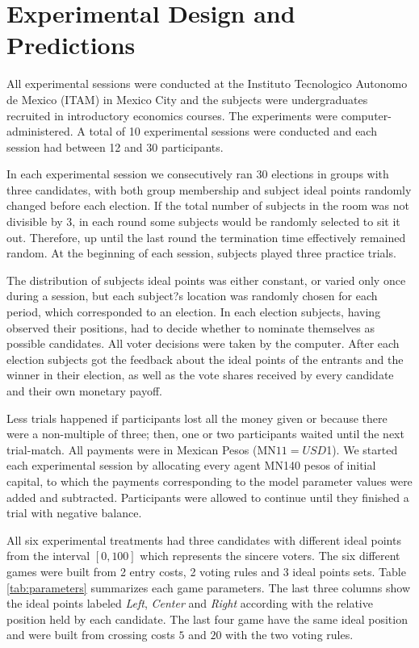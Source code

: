 
\section{Experimental Design and Predictions}

All experimental sessions were conducted at the Instituto Tecnologico Autonomo de Mexico (ITAM) 
in Mexico City and the subjects were undergraduates recruited in introductory economics courses. 
The experiments were computer-administered. A total of 10 experimental sessions were conducted 
and each session had between 12 and 30 participants.

In each experimental session we consecutively ran 30 elections in groups with
three candidates, with both group membership and subject ideal points
randomly changed before each election. If the total number of subjects in the
room was not divisible by 3, in each round some subjects would
be randomly selected to sit it out. Therefore, up until the last round the termination
time effectively remained random. At the beginning of each session, subjects played three practice trials.

The distribution of subjects ideal points was either constant, or varied only
once during a session, but each subject?s location was randomly chosen for each
period, which corresponded to an election. In each election subjects, having
observed their positions, had to decide whether to nominate themselves as possible
candidates. All voter decisions were taken by the computer. After each election
subjects got the feedback about the ideal points of the entrants and the
winner in their election, as well as the vote shares received by every candidate
and their own monetary payoff.

Less trials happened if participants lost all the money given or because there were a non-multiple of three; 
then, one or two participants waited until the next trial-match. 
All payments were in Mexican Pesos (MN$11 = USD$1). We started each experimental
session by allocating every agent MN140 pesos of initial capital, to
which the payments corresponding to the model parameter values were added
and subtracted. Participants were allowed to continue until 
they finished a trial with negative balance.

All six experimental treatments had three candidates with different ideal points from the interval $[0, 100]$ 
which represents the sincere voters. The six different games were built from 2 entry costs, 
2 voting rules and 3 ideal points sets. Table \ref{tab:parameters} summarizes each game parameters. 
The last three columns show the ideal points labeled \emph{Left}, \emph{Center} and \emph{Right} according 
with the relative position held by each candidate. The last four game have the same ideal position and were 
built from crossing costs $5$ and $20$ with the two voting rules. 


